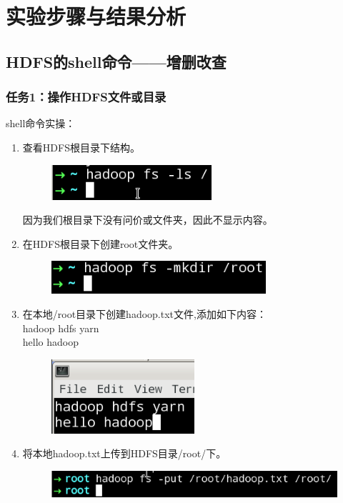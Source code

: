\documentclass {article}
\begin{document}
	\section{实验步骤与结果分析}
		\subsection{HDFS的shell命令——增删改查}
			\subsubsection{任务1：操作HDFS文件或目录}
				shell命令实操：
				\begin{enumerate}
					\item 查看HDFS根目录下结构。
					\begin{figure}[H]
						\centering
						\includegraphics{figures/fig1.png}
					\end{figure}
				
					因为我们根目录下没有问价或文件夹，因此不显示内容。
					\item 在HDFS根目录下创建root文件夹。
					\begin{figure}[H]
						\centering
						\includegraphics{figures/fig2.png}
					\end{figure}
				
					\item 在本地/root目录下创建hadoop.txt文件,添加如下内容：\\
					hadoop hdfs yarn \\
					hello hadoop
					\begin{figure}[H]
						\centering
						\includegraphics{figures/fig3.png}
					\end{figure}
					
					\item 将本地hadoop.txt上传到HDFS目录/root/下。
					\begin{figure}[H]
						\centering
						\includegraphics{figures/fig4.png}
					\end{figure}
				

\end{enumerate}
\end{document}
